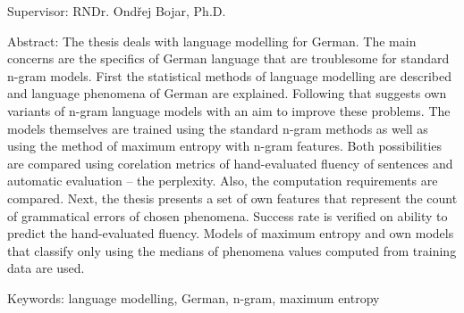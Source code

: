 \documentclass[12pt,a4paper]{report}
\let\openright=\clearpage
\begin{document}
{Supervisor:
RNDr. Ondřej Bojar, Ph.D.

Abstract:
The thesis deals with language modelling for German. The main concerns are the specifics of German language that are troublesome for standard n-gram models. First the statistical methods of language modelling are described and language phenomena of German are explained. Following that suggests own variants of n-gram language models with an aim to improve these problems. The models themselves are trained using the standard n-gram methods as well as using the method of maximum entropy with n-gram features. Both possibilities are compared using corelation metrics of hand-evaluated fluency of sentences and automatic evaluation -- the perplexity. Also, the computation requirements are compared. Next, the thesis presents a set of own features that represent the count of grammatical errors of chosen phenomena. Success rate is verified on ability to predict the hand-evaluated fluency. Models of maximum entropy and own models that classify only using the medians of phenomena values computed from training data are used.

Keywords:
language modelling, German, n-gram, maximum entropy

\vss}

\newpage




\setlength\textheight{257mm}
\pagestyle{empty}

\openright

\tableofcontents

%
%
%


\captionsetup[figure]{aboveskip=0pt, parskip=0pt}
\end{document}
